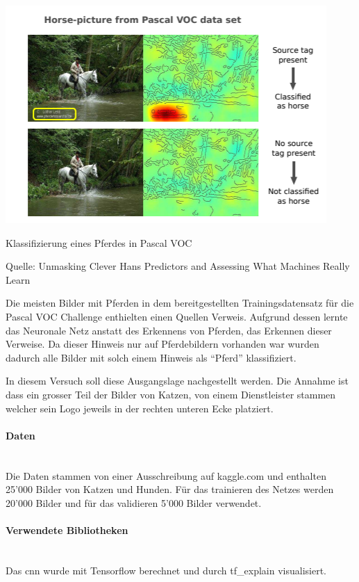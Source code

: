 \documentclass[
  12pt, %
  a4paper, %
  oneside, %
  openany, 
  numbers=noenddot, %
  BCOR=5mm, %
  parskip=half*, %
  thesis, %
]{bfhbook}
\newcommand{\parag}[1]{\paragraph*{#1}\mbox{}\\}
\begin{document}
\begin{center}
\begin{minipage}[t]{0.45\linewidth}
\vspace{0pt}
\includegraphics[width=\linewidth]{Bilder/HorsePredictionPascalVOC.PNG}
\caption{Klassifizierung eines Pferdes in Pascal VOC}
\caption*{Quelle: Unmasking Clever Hans Predictors and Assessing What Machines Really Learn \cite{Lapuschkin2019}}
\end{minipage}\hfill
\begin{minipage}[t]{0.45\linewidth}
\vspace{20pt}
Die meisten Bilder mit Pferden in dem bereitgestellten Trainingsdatensatz für die Pascal VOC Challenge enthielten einen Quellen Verweis. Aufgrund dessen lernte das Neuronale Netz anstatt des Erkennens von  Pferden, das Erkennen dieser Verweise. Da dieser Hinweis nur auf Pferdebildern vorhanden war wurden dadurch alle Bilder mit solch einem Hinweis als ``Pferd'' klassifiziert.
\end{minipage}
\end{center}

\break
In diesem Versuch soll diese Ausgangslage nachgestellt werden. Die Annahme ist dass ein grosser Teil der Bilder von Katzen, von einem Dienstleister stammen welcher sein Logo jeweils in der rechten unteren Ecke platziert. 

\parag{Daten}
Die Daten stammen von einer Ausschreibung auf kaggle.com \cite{kaggleDogCats} und enthalten 25'000 Bilder von Katzen und Hunden. Für das trainieren des Netzes werden 20'000 Bilder und für das validieren 5'000 Bilder verwendet.

\parag{Verwendete Bibliotheken}
Das \Gls{cnn} wurde mit Tensorflow \cite{TensorFlow} berechnet und durch tf\_explain \cite{tfExplain} visualisiert.
\end{document}
